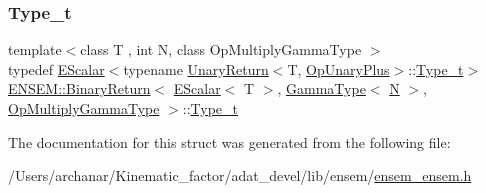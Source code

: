 \subsubsection{\texorpdfstring{Type\_t}{Type\_t}\hspace{0.1cm}{\footnotesize\ttfamily [2/2]}}
{\footnotesize\ttfamily template$<$class T , int N, class Op\+Multiply\+Gamma\+Type $>$ \\
typedef \mbox{\hyperlink{classENSEM_1_1EScalar}{E\+Scalar}}$<$typename \mbox{\hyperlink{structENSEM_1_1UnaryReturn}{Unary\+Return}}$<$T, \mbox{\hyperlink{structENSEM_1_1OpUnaryPlus}{Op\+Unary\+Plus}}$>$\+::\mbox{\hyperlink{structENSEM_1_1BinaryReturn_3_01EScalar_3_01T_01_4_00_01GammaType_3_01N_01_4_00_01OpMultiplyGammaType_01_4_a6ea5f421f71c1cf3afab8ce6d642b9dc}{Type\+\_\+t}}$>$ \mbox{\hyperlink{structENSEM_1_1BinaryReturn}{E\+N\+S\+E\+M\+::\+Binary\+Return}}$<$ \mbox{\hyperlink{classENSEM_1_1EScalar}{E\+Scalar}}$<$ T $>$, \mbox{\hyperlink{classENSEM_1_1GammaType}{Gamma\+Type}}$<$ \mbox{\hyperlink{operator__name__util_8cc_a7722c8ecbb62d99aee7ce68b1752f337}{N}} $>$, \mbox{\hyperlink{structENSEM_1_1OpMultiplyGammaType}{Op\+Multiply\+Gamma\+Type}} $>$\+::\mbox{\hyperlink{structENSEM_1_1BinaryReturn_3_01EScalar_3_01T_01_4_00_01GammaType_3_01N_01_4_00_01OpMultiplyGammaType_01_4_a6ea5f421f71c1cf3afab8ce6d642b9dc}{Type\+\_\+t}}}



The documentation for this struct was generated from the following file\+:\begin{DoxyCompactItemize}
\item 
/\+Users/archanar/\+Kinematic\+\_\+factor/adat\+\_\+devel/lib/ensem/\mbox{\hyperlink{lib_2ensem_2ensem__ensem_8h}{ensem\+\_\+ensem.\+h}}\end{DoxyCompactItemize}
